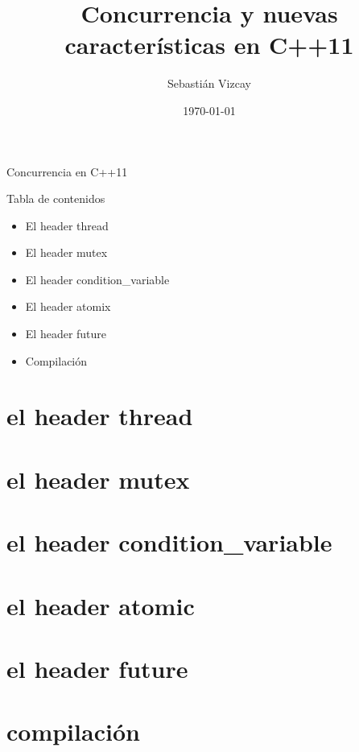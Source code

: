 \documentclass[xcolor=table]{beamer}
\author{Sebastián Vizcay}
\title{Concurrencia y nuevas características en C++11}
\date{\today}
\begin{document}
\begin{frame}

\titlepage
\end{frame}

\begin{frame}{Concurrencia en C++11}
\begin{block}{Tabla de contenidos}
\begin{itemize}
  \item El header thread
  \item El header mutex
  \item El header condition\_variable
  \item El header atomix
  \item El header future
  \item Compilación
\end{itemize}
\end{block}
\end{frame}

\section{el header thread}


\section{el header mutex}


\section{el header condition\_variable}


\section{el header atomic}


\section{el header future}


\section{compilación}


\section{}

\end{document}
